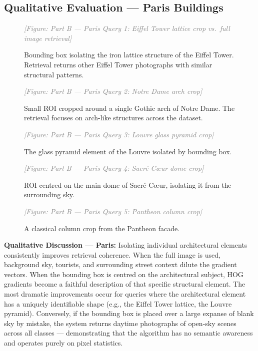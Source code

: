 \documentclass[11pt, a4paper]{article}
\newcommand{\imagebox}[2]{%
  \begin{mdframed}[backgroundcolor=gray!15, linecolor=gray!50, linewidth=1pt]
    \centering
    \vspace{#2}
    \textcolor{gray}{\textit{[Figure: #1]}}
    \vspace{#2}
  \end{mdframed}
}
\begin{document}
\subsection{Qualitative Evaluation — Paris Buildings}

\begin{figure}[H]
  \centering
  \imagebox{Part B — Paris Query 1: Eiffel Tower lattice crop vs.\ full image retrieval}{3cm}
  \caption{Bounding box isolating the iron lattice structure of the Eiffel Tower. Retrieval returns other Eiffel Tower photographs with similar structural patterns.}
  \label{fig:partB_paris_1}
\end{figure}

\begin{figure}[H]
  \centering
  \imagebox{Part B — Paris Query 2: Notre Dame arch crop}{3cm}
  \caption{Small ROI cropped around a single Gothic arch of Notre Dame. The retrieval focuses on arch-like structures across the dataset.}
  \label{fig:partB_paris_2}
\end{figure}

\begin{figure}[H]
  \centering
  \imagebox{Part B — Paris Query 3: Louvre glass pyramid crop}{3cm}
  \caption{The glass pyramid element of the Louvre isolated by bounding box.}
  \label{fig:partB_paris_3}
\end{figure}

\begin{figure}[H]
  \centering
  \imagebox{Part B — Paris Query 4: Sacré-Cœur dome crop}{3cm}
  \caption{ROI centred on the main dome of Sacré-Cœur, isolating it from the surrounding sky.}
  \label{fig:partB_paris_4}
\end{figure}

\begin{figure}[H]
  \centering
  \imagebox{Part B — Paris Query 5: Pantheon column crop}{3cm}
  \caption{A classical column crop from the Pantheon facade.}
  \label{fig:partB_paris_5}
\end{figure}

\textbf{Qualitative Discussion — Paris:} Isolating individual architectural elements consistently improves retrieval coherence. When the full image is used, background sky, tourists, and surrounding street context dilute the gradient vectors. When the bounding box is centred on the architectural subject, HOG gradients become a faithful description of that specific structural element. The most dramatic improvements occur for queries where the architectural element has a uniquely identifiable shape (e.g., the Eiffel Tower lattice, the Louvre pyramid). Conversely, if the bounding box is placed over a large expanse of blank sky by mistake, the system returns daytime photographs of open-sky scenes across all classes — demonstrating that the algorithm has no semantic awareness and operates purely on pixel statistics.
\end{document}
